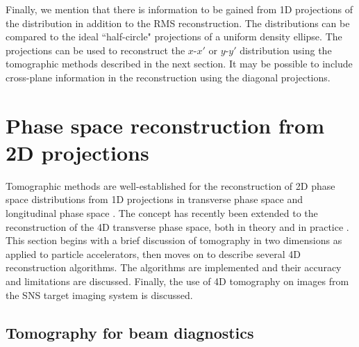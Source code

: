 Finally, we mention that there is information to be gained from 1D projections of the distribution in addition to the RMS reconstruction. The distributions can be compared to the ideal ``half-circle" projections of a uniform density ellipse. The projections can be used to reconstruct the $x$-$x'$ or $y$-$y'$ distribution using the tomographic methods described in the next section. It may be possible to include cross-plane information in the reconstruction using the diagonal projections. 






\section{Phase space reconstruction from 2D projections}

Tomographic methods are well-established for the reconstruction of 2D phase space distributions from 1D projections in transverse phase space \cite{Hock2014} and longitudinal phase space \cite{Evans2014}. The concept has recently been extended to the reconstruction of the 4D transverse phase space, both in theory and in practice \cite{Hock2013b, Wang2019, Wolski2020}. This section begins with a brief discussion of tomography in two dimensions as applied to particle accelerators, then moves on to describe several 4D reconstruction algorithms. The algorithms are implemented and their accuracy and limitations are discussed. Finally, the use of 4D tomography on images from the SNS target imaging system is discussed.



\subsection{Tomography for beam diagnostics}

